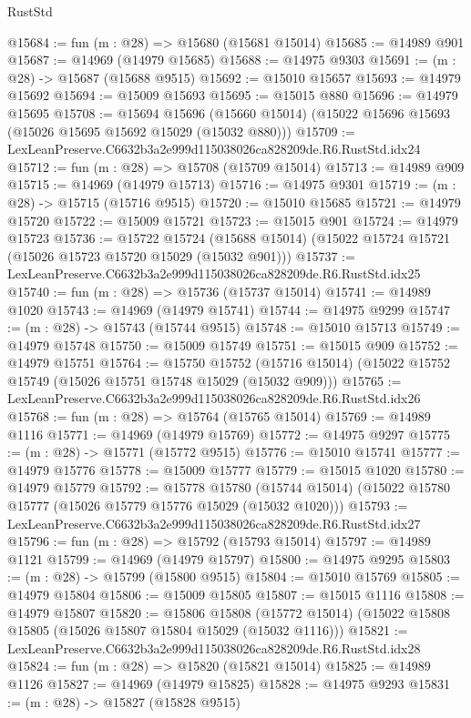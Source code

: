 \begin{lexlean}{RustStd}
\begin{coremodule}
@15684 := fun (m : @28) => @15680 (@15681 @15014)
@15685 := @14989 @901
@15687 := @14969 (@14979 @15685)
@15688 := @14975 @9303
@15691 := (m : @28) -> @15687 (@15688 @9515)
@15692 := @15010 @15657
@15693 := @14979 @15692
@15694 := @15009 @15693
@15695 := @15015 @880
@15696 := @14979 @15695
@15708 := @15694
    @15696
    (@15660 @15014)
    (@15022 @15696 @15693 (@15026 @15695 @15692 @15029 (@15032 @880)))
@15709 := LexLeanPreserve.C6632b3a2e999d115038026ca828209de.R6.RustStd.idx24
@15712 := fun (m : @28) => @15708 (@15709 @15014)
@15713 := @14989 @909
@15715 := @14969 (@14979 @15713)
@15716 := @14975 @9301
@15719 := (m : @28) -> @15715 (@15716 @9515)
@15720 := @15010 @15685
@15721 := @14979 @15720
@15722 := @15009 @15721
@15723 := @15015 @901
@15724 := @14979 @15723
@15736 := @15722
    @15724
    (@15688 @15014)
    (@15022 @15724 @15721 (@15026 @15723 @15720 @15029 (@15032 @901)))
@15737 := LexLeanPreserve.C6632b3a2e999d115038026ca828209de.R6.RustStd.idx25
@15740 := fun (m : @28) => @15736 (@15737 @15014)
@15741 := @14989 @1020
@15743 := @14969 (@14979 @15741)
@15744 := @14975 @9299
@15747 := (m : @28) -> @15743 (@15744 @9515)
@15748 := @15010 @15713
@15749 := @14979 @15748
@15750 := @15009 @15749
@15751 := @15015 @909
@15752 := @14979 @15751
@15764 := @15750
    @15752
    (@15716 @15014)
    (@15022 @15752 @15749 (@15026 @15751 @15748 @15029 (@15032 @909)))
@15765 := LexLeanPreserve.C6632b3a2e999d115038026ca828209de.R6.RustStd.idx26
@15768 := fun (m : @28) => @15764 (@15765 @15014)
@15769 := @14989 @1116
@15771 := @14969 (@14979 @15769)
@15772 := @14975 @9297
@15775 := (m : @28) -> @15771 (@15772 @9515)
@15776 := @15010 @15741
@15777 := @14979 @15776
@15778 := @15009 @15777
@15779 := @15015 @1020
@15780 := @14979 @15779
@15792 := @15778
    @15780
    (@15744 @15014)
    (@15022 @15780 @15777 (@15026 @15779 @15776 @15029 (@15032 @1020)))
@15793 := LexLeanPreserve.C6632b3a2e999d115038026ca828209de.R6.RustStd.idx27
@15796 := fun (m : @28) => @15792 (@15793 @15014)
@15797 := @14989 @1121
@15799 := @14969 (@14979 @15797)
@15800 := @14975 @9295
@15803 := (m : @28) -> @15799 (@15800 @9515)
@15804 := @15010 @15769
@15805 := @14979 @15804
@15806 := @15009 @15805
@15807 := @15015 @1116
@15808 := @14979 @15807
@15820 := @15806
    @15808
    (@15772 @15014)
    (@15022 @15808 @15805 (@15026 @15807 @15804 @15029 (@15032 @1116)))
@15821 := LexLeanPreserve.C6632b3a2e999d115038026ca828209de.R6.RustStd.idx28
@15824 := fun (m : @28) => @15820 (@15821 @15014)
@15825 := @14989 @1126
@15827 := @14969 (@14979 @15825)
@15828 := @14975 @9293
@15831 := (m : @28) -> @15827 (@15828 @9515)

\end{coremodule}
\end{lexlean}
